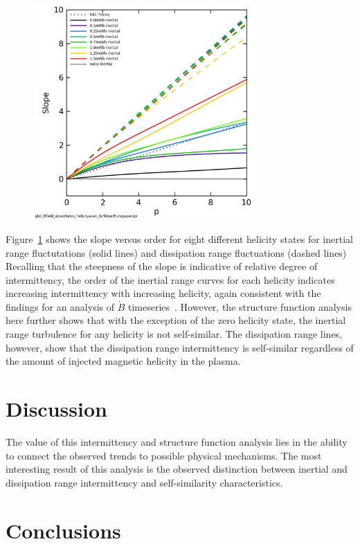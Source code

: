 \documentclass[aps,prl,amsmath,amssymb,reprint,superscriptaddress]{revtex4-1} %
\begin{document}
\begin{figure}[!htbp]
\centerline{
\includegraphics[width=8.5cm]{Bmod_StructureFunctionSlope_vs_Moment_helicityscan.png}}
\caption{\label{fig:helscan} }
\end{figure}

Figure~\ref{fig:helscan} shows the slope versus order for eight different helicity states for inertial range fluctutations (solid lines) and dissipation range fluctuations (dashed lines) Recalling that the steepness of the slope is indicative of relative degree of intermittency, the order of the inertial range curves for each helicity indicates increasing intermittency with increasing helicity, again consistent with the findings for an analysis of $\dot{B}$ timeseries~\cite{schaffner2014b}. However, the structure function analysis here further shows that with the exception of the zero helicity state, the inertial range turbulence for any helicity is not self-similar. The dissipation range lines, however, show that the dissipation range intermittency is self-similar regardless of the amount of injected magnetic helicity in the plasma.

\section{Discussion}

The value of this intermittency and structure function analysis lies in the ability to connect the observed trends to possible physical mechanisms. The most interesting result of this analysis is the observed distinction between inertial and dissipation range intermittency and self-similarity characteristics.


\section{Conclusions}\label{sec:conclusions}
\end{document}
